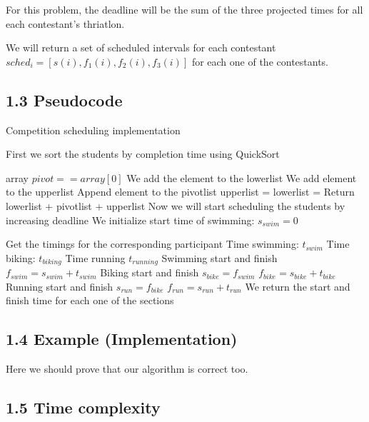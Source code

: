 \documentclass{article}
\begin{document}
For this problem, the deadline will be the sum of the three projected times for all each contestant's thriatlon.

We will return a set of scheduled intervals for each contestant $sched_i = [s(i),f_1(i),f_2(i),f_3(i)]$ for each one of the contestants.

\subsection*{1.3 Pseudocode}

\begin{algorithm}[H]
\caption{Competition scheduling implementation}
\begin{algorithmic}[1]
\State First we sort the students by completion time using QuickSort

  \Return array
 \EndIf
  \State $pivot == array[0]$
    \State We add the element to the lowerlist
   \EndIf
    \State We add element to the upperlist
   \EndIf
    \State Append element to the pivotlist
   \EndIf
  \EndFor
  \State upperlist = 
  \State lowerlist = 
 \EndIf
 \State Return lowerlist + pivotlist + upperlist
\EndFunction
\State
\State Now we will start scheduling the students by increasing deadline
\State We initialize start time of swimming: $s_{swim} = 0$

 \State Get the timings for the corresponding participant
 \State Time swimming: $t_{swim}$
 \State Time biking: $t_{biking}$
 \State Time running $t_{running}$
 \State
 \State Swimming start and finish
 \State $f_{swim} = s_{swim} + t_{swim}$
 \State
 \State Biking start and finish
 \State $s_{bike} = f_{swim}$
 \State $f_{bike} = s_{bike} + t_{bike}$
 \State
 \State Running start and finish
 \State $s_{run} = f_{bike}$
 \State $f_{run} = s_{run} + t_{run}$
 \State
 \State We return the start and finish time for each one of the sections

\EndWhile
\end{algorithmic}
\end{algorithm}

\subsection*{1.4 Example (Implementation)}

Here we should prove that our algorithm is correct too.



\subsection*{1.5 Time complexity}
\end{document}
